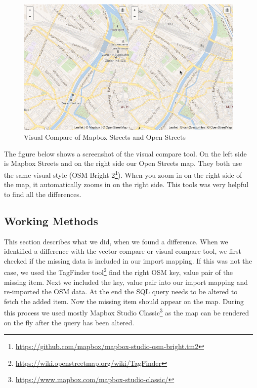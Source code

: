\begin{figure}[H]
  \centering
  \includegraphics[width=1\textwidth]{images/visual_compare.png}
  \caption{Visual Compare of Mapbox Streets and Open Streets}
\end{figure}

The figure below shows a screenshot of the visual compare tool. On the left side is Mapbox Streets and on the right side our Open Streets map. They both use the same visual style (OSM Bright 2\footnote{\url{https://github.com/mapbox/mapbox-studio-osm-bright.tm2}}). When you zoom in on the right side of the map, it automatically zooms in on the right side. This tools was very helpful to find all the differences.

\subsection{Working Methods}
This section describes what we did, when we found a difference. When we identified a difference with the vector compare or visual compare tool, we first checked if the missing data is included in our import mapping. If this was not the case, we used the TagFinder tool\footnote{\url{https://wiki.openstreetmap.org/wiki/TagFinder}} find the right OSM key, value pair of the missing item. Next we included the key, value pair into our import mapping and re-imported the OSM data. At the end the SQL query needs to be altered to fetch the added item. Now the missing item should appear on the map. During this process we used mostly Mapbox Studio Classic\footnote{\url{https://www.mapbox.com/mapbox-studio-classic/}} as the map can be rendered on the fly after the query has been altered.